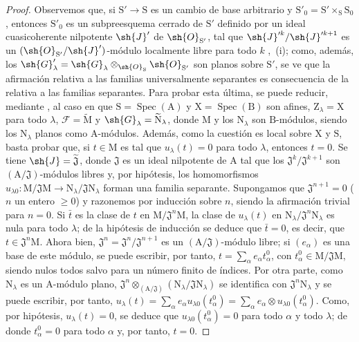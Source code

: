 \begin{proof}
Observemos que, si $\mathrm{S}'\to\mathrm{S}$ es un cambio de base arbitrario y $\mathrm{S}'_0=\mathrm{S}'\times_\mathrm{S}\mathrm{S}_0$, entonces $\mathrm{S}'_0$ es un subpreesquema cerrado de $\mathrm{S}'$ definido por un ideal cuasicoherente nilpotente $\sh{J}'$ de $\sh{O}_{\mathrm{S}'}$, tal que $\sh{J}'^k/\sh{J}'^{k+1}$ es un $(\sh{O}_{\mathrm{S}'}/\sh{J}')$-módulo localmente libre para todo $k$ ,~(i); como, además, los $\sh{G}'_\lambda=\sh{G}_\lambda\otimes_{\sh{O}_\mathrm{S}}\sh{O}_{\mathrm{S}'}$ son planos sobre $\mathrm{S}'$, se ve que la afirmación relativa a las familias universalmente separantes es consecuencia de la relativa a las familias separantes.
Para probar esta última, se puede reducir, mediante , al caso en que $\mathrm{S}=\operatorname{Spec}(\mathrm{A})$ y $\mathrm{X}=\operatorname{Spec}(\mathrm{B})$ son afines, $\mathrm{Z}_\lambda=\mathrm{X}$ para todo $\lambda$, $\mathscr{F}=\widetilde{\mathrm{M}}$ y $\sh{G}_\lambda=\widetilde{\mathrm{N}}_\lambda$, donde $\mathrm{M}$ y los $\mathrm{N}_\lambda$ son $\mathrm{B}$-módulos, siendo los $\mathrm{N}_\lambda$ planos como $\mathrm{A}$-módulos.
Además, como la cuestión es local sobre $\mathrm{X}$ y $\mathrm{S}$, basta probar que, si $t\in\mathrm{M}$ es tal que $u_\lambda(t)=0$ para todo $\lambda$, entonces $t=0$.
Se tiene $\sh{J}=\widetilde{\mathfrak{J}}$, donde $\mathfrak{J}$ es un ideal nilpotente de $\mathrm{A}$ tal que los $\mathfrak{J}^k/\mathfrak{J}^{k+1}$ son $(\mathrm{A}/\mathfrak{J})$-módulos libres y, por hipótesis, los homomorfismos $u_{\lambda 0}:\mathrm{M}/\mathfrak{J}\mathrm{M}\to\mathrm{N}_\lambda/\mathfrak{J}\mathrm{N}_\lambda$ forman una familia separante.
Supongamos que $\mathfrak{J}^{n+1}=0$ ($n$ un entero $\geq 0$) y razonemos por inducción sobre $n$, siendo la afirmación trivial para $n=0$.
Si $\bar{t}$ es la clase de $t$ en $\mathrm{M}/\mathfrak{J}^n\mathrm{M}$, la clase de $u_\lambda(t)$ en $\mathrm{N}_\lambda/\mathfrak{J}^n\mathrm{N}_\lambda$ es nula para todo $\lambda$; de la hipótesis de inducción se deduce que $\bar{t}=0$, es decir, que $t\in\mathfrak{J}^n\mathrm{M}$.
Ahora bien, $\mathfrak{J}^n=\mathfrak{J}^n/\mathfrak{J}^{n+1}$ es un $(\mathrm{A}/\mathfrak{J})$-módulo libre; si $(e_\alpha)$ es una base de este módulo, se puede escribir, por tanto, $t=\sum_\alpha e_\alpha t_\alpha^0$, con $t_\alpha^0\in\mathrm{M}/\mathfrak{J}\mathrm{M}$, siendo nulos todos salvo para un número finito de índices.
Por otra parte, como $\mathrm{N}_\lambda$ es un $\mathrm{A}$-módulo plano, $\mathfrak{J}^n\otimes_{(\mathrm{A}/\mathfrak{J})}(\mathrm{N}_\lambda/\mathfrak{J}\mathrm{N}_\lambda)$ se identifica con $\mathfrak{J}^n\mathrm{N}_\lambda$ y se puede escribir, por tanto, $u_\lambda(t)=\sum_\alpha e_\alpha u_{\lambda 0}(t_\alpha^0)=\sum_\alpha e_\alpha\otimes u_{\lambda 0}(t_\alpha^0)$.
Como, por hipótesis, $u_\lambda(t)=0$, se deduce que $u_{\lambda 0}(t_\alpha^0)=0$ para todo $\alpha$ y todo $\lambda$; de donde $t_\alpha^0=0$ para todo $\alpha$ y, por tanto, $t=0$.
\end{proof}

